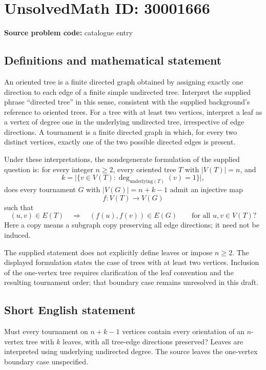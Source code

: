 \documentclass[11pt]{article}
\begin{document}
\section*{UnsolvedMath ID: 30001666}
\textbf{Source problem code:} catalogue entry
\subsection{Definitions and mathematical statement}
An oriented tree is a finite directed graph obtained by assigning exactly one direction to each edge of a finite simple undirected tree. Interpret the supplied phrase ``directed tree'' in this sense, consistent with the supplied background's reference to oriented trees. For a tree with at least two vertices, interpret a leaf as a vertex of degree one in the underlying undirected tree, irrespective of edge directions. A tournament is a finite directed graph in which, for every two distinct vertices, exactly one of the two possible directed edges is present.

Under these interpretations, the nondegenerate formulation of the supplied question is: for every integer \(n\geq 2\), every oriented tree \(T\) with \(|V(T)|=n\), and
\[
k=\bigl|\{v\in V(T):\deg_{\mathrm{underlying}(T)}(v)=1\}\bigr|,
\]
does every tournament \(G\) with \(|V(G)|=n+k-1\) admit an injective map
\[
f:V(T)\longrightarrow V(G)
\]
such that
\[
(u,v)\in E(T)\quad\Longrightarrow\quad(f(u),f(v))\in E(G)
\qquad\text{for all }u,v\in V(T)?
\]
Here a copy means a subgraph copy preserving all edge directions; it need not be induced.

The supplied statement does not explicitly define leaves or impose \(n\geq2\). The displayed formulation states the case of trees with at least two vertices. Inclusion of the one-vertex tree requires clarification of the leaf convention and the resulting tournament order; that boundary case remains unresolved in this draft.
\subsection{Short English statement}
Must every tournament on \(n+k-1\) vertices contain every orientation of an \(n\)-vertex tree with \(k\) leaves, with all tree-edge directions preserved? Leaves are interpreted using underlying undirected degree. The source leaves the one-vertex boundary case unspecified.
\end{document}
